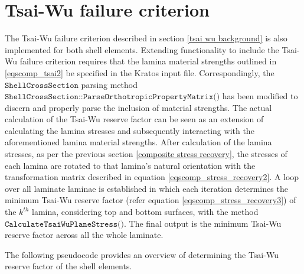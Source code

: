 \section{Tsai-Wu failure criterion}
The Tsai-Wu failure criterion described in section \ref{tsai wu background} is also implemented for both shell elements. Extending functionality to include the Tsai-Wu failure criterion requires that the lamina material strengths outlined in \ref{eqscomp_tsai2} be specified in the Kratos input file. Correspondingly, the $\texttt{ShellCrossSection}$ parsing method \linebreak$\texttt{ShellCrossSection::ParseOrthotropicPropertyMatrix()}$ has been modified to discern and properly parse the inclusion of material strengths. The actual calculation of the Tsai-Wu reserve factor can be seen as an extension of calculating the lamina stresses and subsequently interacting with the aforementioned lamina material strengths. After calculation of the lamina stresses, as per the previous section \ref{composite stress recovery}, the stresses of each lamina are rotated to that lamina's natural orientation with the transformation matrix described in equation \ref{eqscomp_stress_recovery2}. A loop over all laminate laminae is established in which each iteration determines the minimum Tsai-Wu reserve factor (refer equation \ref{eqscomp_stress_recovery3}) of the $k^{th}$ lamina, considering top and bottom surfaces, with the method $\texttt{CalculateTsaiWuPlaneStress()}$. The final output is the minimum Tsai-Wu reserve factor across all the whole laminate.

The following pseudocode provides an overview of determining the Tsai-Wu reserve factor of the shell elements.


